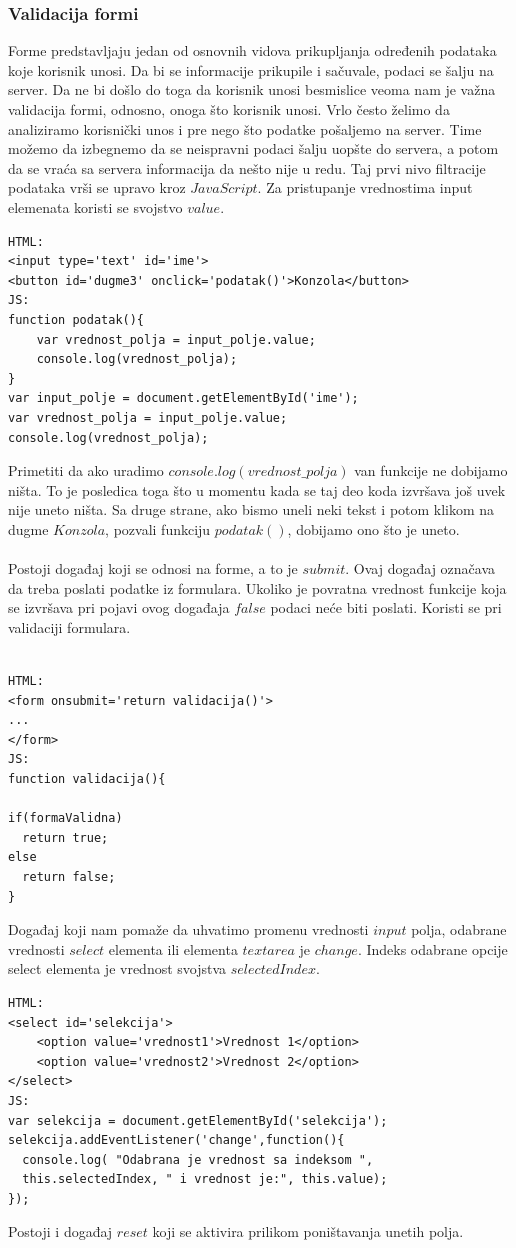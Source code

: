\subsubsection{Validacija formi}
Forme predstavljaju jedan od osnovnih vidova prikupljanja određenih podataka koje korisnik unosi. Da bi se informacije prikupile i sačuvale, podaci se šalju na server. Da ne bi došlo do toga da korisnik unosi besmislice veoma nam je važna validacija formi, odnosno, onoga što korisnik unosi.
Vrlo često želimo da analiziramo korisnički unos i pre nego što podatke pošaljemo na server. Time možemo da izbegnemo da se neispravni podaci šalju uopšte do servera, a potom da se vraća sa servera informacija da nešto nije u redu. Taj prvi nivo filtracije podataka vrši se upravo kroz $JavaScript$. Za pristupanje vrednostima input elemenata koristi se svojstvo $value$.
\begin{lstlisting}[backgroundcolor = \color{lightgray}, breaklines=true]
HTML:
<input type='text' id='ime'>
<button id='dugme3' onclick='podatak()'>Konzola</button>
JS:
function podatak(){
	var vrednost_polja = input_polje.value;
	console.log(vrednost_polja);    
}
var input_polje = document.getElementById('ime');
var vrednost_polja = input_polje.value;
console.log(vrednost_polja);
\end{lstlisting}
Primetiti da ako uradimo $console.log(vrednost\_polja)$ van funkcije ne dobijamo ništa. To je posledica toga što u momentu kada se taj deo koda izvršava još uvek nije uneto ništa. Sa druge strane, ako bismo uneli neki tekst i potom klikom na dugme $Konzola$, pozvali funkciju $podatak()$, dobijamo ono što je uneto.\\\\

Postoji događaj koji se odnosi na forme, a to je $submit$. Ovaj događaj označava da treba poslati podatke iz formulara. Ukoliko je povratna vrednost funkcije koja se izvršava pri pojavi ovog događaja $false$ podaci neće biti poslati. Koristi se pri validaciji
formulara. \\\\
\begin{lstlisting}[backgroundcolor = \color{lightgray}, breaklines=true]
HTML:
<form onsubmit='return validacija()'>
...
</form>
JS:
function validacija(){

if(formaValidna)
  return true;
else
  return false;
}
\end{lstlisting}
Događaj koji nam pomaže da uhvatimo promenu vrednosti $input$ polja, odabrane vrednosti $select$ elementa ili elementa $textarea$ je $change$. Indeks odabrane opcije select elementa je vrednost svojstva $selectedIndex$.
\begin{lstlisting}[backgroundcolor = \color{lightgray}, breaklines=true]
HTML:
<select id='selekcija'>
	<option value='vrednost1'>Vrednost 1</option>
    <option value='vrednost2'>Vrednost 2</option>
</select>
JS:
var selekcija = document.getElementById('selekcija');
selekcija.addEventListener('change',function(){     
  console.log( "Odabrana je vrednost sa indeksom ",
  this.selectedIndex, " i vrednost je:", this.value);
});
\end{lstlisting}
Postoji i događaj $reset$ koji se aktivira prilikom poništavanja unetih polja. 

